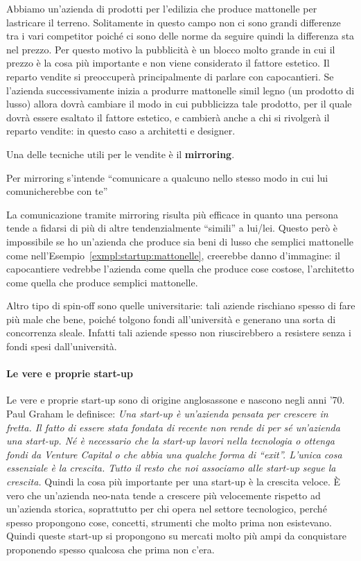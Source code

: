 \begin{example}\label{exmpl:startup:mattonelle}
Abbiamo un'azienda di prodotti per l'edilizia che produce mattonelle per
lastricare il terreno. Solitamente in questo campo non ci sono grandi
differenze tra i vari competitor poiché ci sono delle norme da seguire quindi
la differenza sta nel prezzo. Per questo motivo la pubblicità è un blocco molto
grande in cui il prezzo è la cosa più importante e non viene considerato il
fattore estetico. Il reparto vendite si preoccuperà principalmente di parlare
con capocantieri. Se l'azienda successivamente inizia a produrre mattonelle
simil legno (un prodotto di lusso) allora dovrà cambiare il modo in cui
pubblicizza tale prodotto, per il quale dovrà essere esaltato il fattore
estetico, e cambierà anche a chi si rivolgerà il reparto vendite: in
questo caso a architetti e designer.
\end{example}

\noindent Una delle tecniche utili per le vendite è il \textbf{mirroring}.
\begin{definition}[Mirroring]
 Per mirroring s'intende ``comunicare a qualcuno nello stesso modo in cui lui
comunicherebbe con te''
\end{definition}

\noindent La comunicazione tramite mirroring risulta più efficace in quanto una
persona tende a fidarsi di più di altre tendenzialmente ``simili'' a lui/lei.
Questo però è impossibile se ho un'azienda che produce sia beni di lusso che
semplici mattonelle come nell'Esempio~\ref{exmpl:startup:mattonelle}, creerebbe
danno d'immagine: il capocantiere vedrebbe l'azienda come quella che produce
cose costose, l'architetto come quella che produce semplici mattonelle.

Altro tipo di spin-off sono quelle universitarie: tali aziende rischiano spesso
di fare più male che bene, poiché tolgono fondi all'università e generano una
sorta di concorrenza sleale. Infatti tali aziende spesso non riuscirebbero a
resistere senza i fondi spesi dall'università.

\paragraph*{Le vere e proprie start-up} Le vere e proprie start-up sono di
origine anglosassone e nascono negli anni '70. Paul Graham le definisce:
\emph{
Una start-up è un'azienda pensata per crescere in fretta. Il fatto di essere
stata fondata di recente non rende di per sé un'azienda una start-up. Né è
necessario che la start-up lavori nella tecnologia o ottenga fondi da Venture
Capital o che abbia una qualche forma di ``exit''. L'unica cosa essenziale è
la crescita. Tutto il resto che noi associamo alle start-up segue la crescita.
}
Quindi la cosa più importante per una start-up è la crescita veloce.
È vero che un'azienda neo-nata tende a crescere più velocemente rispetto ad
un'azienda storica, soprattutto per chi opera nel settore tecnologico, perché
spesso propongono cose, concetti, strumenti che molto prima non esistevano.
Quindi queste start-up si propongono su mercati molto più ampi da conquistare
proponendo spesso qualcosa che prima non c'era.

